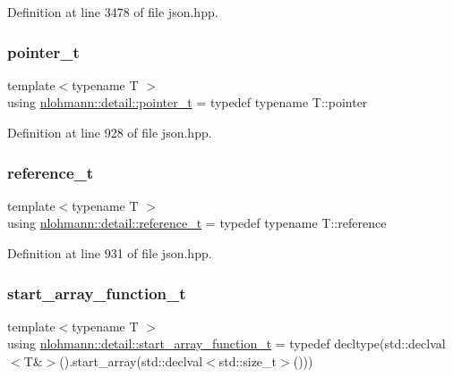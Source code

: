 Definition at line 3478 of file json.\+hpp.

\mbox{\label{namespacenlohmann_1_1detail_a26dc71e2dd9336587e56062178f9abce}} 
\subsubsection{\texorpdfstring{pointer\_t}{pointer\_t}}
{\footnotesize\ttfamily template$<$typename T $>$ \\
using \mbox{\hyperlink{namespacenlohmann_1_1detail_a26dc71e2dd9336587e56062178f9abce}{nlohmann\+::detail\+::pointer\+\_\+t}} = typedef typename T\+::pointer}



Definition at line 928 of file json.\+hpp.

\mbox{\label{namespacenlohmann_1_1detail_a082bdafd3b4c61d9d1e92b35b8f75ee3}} 
\subsubsection{\texorpdfstring{reference\_t}{reference\_t}}
{\footnotesize\ttfamily template$<$typename T $>$ \\
using \mbox{\hyperlink{namespacenlohmann_1_1detail_a082bdafd3b4c61d9d1e92b35b8f75ee3}{nlohmann\+::detail\+::reference\+\_\+t}} = typedef typename T\+::reference}



Definition at line 931 of file json.\+hpp.

\mbox{\label{namespacenlohmann_1_1detail_a80273cecc45765d7b2826ec931fbffdd}} 
\subsubsection{\texorpdfstring{start\_array\_function\_t}{start\_array\_function\_t}}
{\footnotesize\ttfamily template$<$typename T $>$ \\
using \mbox{\hyperlink{namespacenlohmann_1_1detail_a80273cecc45765d7b2826ec931fbffdd}{nlohmann\+::detail\+::start\+\_\+array\+\_\+function\+\_\+t}} = typedef decltype(std\+::declval$<$T\&$>$().start\+\_\+array(std\+::declval$<$std\+::size\+\_\+t$>$()))}



